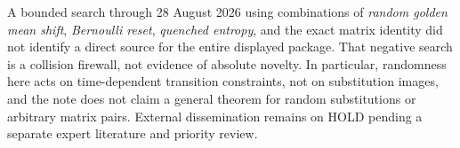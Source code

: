 \documentclass[11pt,a4paper]{amsart}
\theoremstyle{definition}
\theoremstyle{remark}
\begin{document}
A bounded search through 28 August 2026 using combinations of
\emph{random golden mean shift}, \emph{Bernoulli reset}, \emph{quenched
entropy}, and the exact matrix identity did not identify a direct source for
the entire displayed package.  That negative search is a collision
firewall, not evidence of absolute novelty.  In particular, randomness here
acts on time-dependent transition constraints, not on substitution images,
and the note does not claim a general theorem for random substitutions or
arbitrary matrix pairs.  External dissemination remains on HOLD pending a
separate expert literature and priority review.



\end{document}
